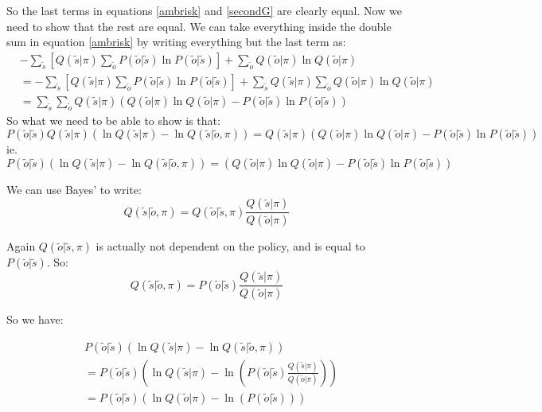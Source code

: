 \documentclass[11pt,oneside]{memoir}
\begin{document}
So the last terms in equations \ref{ambrisk} and \ref{secondG} are clearly equal. Now we need to show that the rest are equal. We can take everything inside the double sum in equation \ref{ambrisk} by writing everything but the last term as:
\begin{align}
&-\sum_{\tilde{s}}\left[Q(\tilde{s}|\pi)\sum_{\tilde{o}}P(\tilde{o}|\tilde{s})\ln P(\tilde{o}|\tilde{s})\right]+\sum_{\tilde{o}}Q(\tilde{o}|\pi)\ln Q(\tilde{o}|\pi)\\
&=-\sum_{\tilde{s}}\left[Q(\tilde{s}|\pi)\sum_{\tilde{o}}P(\tilde{o}|\tilde{s})\ln P(\tilde{o}|\tilde{s})\right]+\sum_{\tilde{s}}Q(\tilde{s}|\pi)\sum_{\tilde{o}}Q(\tilde{o}|\pi)\ln Q(\tilde{o}|\pi)\\&=
\sum_{\tilde{s}}\sum_{\tilde{o}}Q(\tilde{s}|\pi)(Q(\tilde{o}|\pi)\ln Q(\tilde{o}|\pi)-P(\tilde{o}|\tilde{s})\ln P(\tilde{o}|\tilde{s}))
\end{align}
So what we need to be able to show is that:
\begin{equation}
    P(\tilde{o}|\tilde{s})Q(\tilde{s}|\pi)(\ln Q(\tilde{s}|\pi)-\ln Q(\tilde{s}|\tilde{o},\pi))=Q(\tilde{s}|\pi)(Q(\tilde{o}|\pi)\ln Q(\tilde{o}|\pi)-P(\tilde{o}|\tilde{s})\ln P(\tilde{o}|\tilde{s}))
\end{equation}
ie.
\begin{equation}
    P(\tilde{o}|\tilde{s})(\ln Q(\tilde{s}|\pi)-\ln Q(\tilde{s}|\tilde{o},\pi))=(Q(\tilde{o}|\pi)\ln Q(\tilde{o}|\pi)-P(\tilde{o}|\tilde{s})\ln P(\tilde{o}|\tilde{s}))
\end{equation}

We can use Bayes' to write:
$$Q(\tilde{s}|\tilde{o},\pi)=Q(\tilde{o}|\tilde{s},\pi)\frac{Q(\tilde{s}|\pi)}{Q(\tilde{o}|\pi)}$$




Again $Q(\tilde{o}|\tilde{s},\pi)$ is actually not dependent on the policy, and is equal to $P(\tilde{o}|\tilde{s})$. So:
$$Q(\tilde{s}|\tilde{o},\pi)=P(\tilde{o}|\tilde{s})\frac{Q(\tilde{s}|\pi)}{Q(\tilde{o}|\pi)}$$

So we have:

\begin{align}
   &P(\tilde{o}|\tilde{s})(\ln Q(\tilde{s}|\pi)-\ln Q(\tilde{s}|\tilde{o},\pi))\\&=
   P(\tilde{o}|\tilde{s})(\ln Q(\tilde{s}|\pi)-\ln \left(P(\tilde{o}|\tilde{s})\frac{Q(\tilde{s}|\pi)}{Q(\tilde{o}|\pi)}\right))\\&=
   P(\tilde{o}|\tilde{s})(\ln Q(\tilde{o}|\pi)-\ln \left(P(\tilde{o}|\tilde{s})\right))
\end{align}
\end{document}
